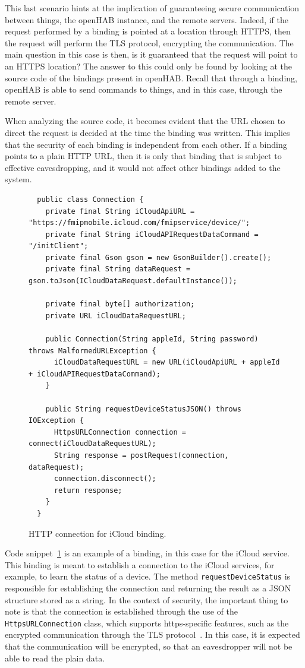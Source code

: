 \documentclass[12pt]{article}
\begin{document}
This last scenario hints at the implication of guaranteeing secure communication between things, the openHAB instance, and the remote servers. Indeed, if the request performed by a binding is pointed at a location through HTTPS, then the request will perform the TLS protocol, encrypting the communication. The main question in this case is then, is it guaranteed that the request will point to an HTTPS location? The answer to this could only be found by looking at the source code of the bindings present in openHAB. Recall that through a binding, openHAB is able to send commands to things, and in this case, through the remote server.

When analyzing the source code, it becomes evident that the URL chosen to direct the request is decided at the time the binding was written. This implies that the security of each binding is independent from each other. If a binding points to a plain HTTP URL, then it is only that binding that is subject to effective eavesdropping, and it would not affect other bindings added to the system.

\begin{figure} [htb]
\begin{lstlisting}
  public class Connection {
    private final String iCloudApiURL = "https://fmipmobile.icloud.com/fmipservice/device/";
    private final String iCloudAPIRequestDataCommand = "/initClient";
    private final Gson gson = new GsonBuilder().create();
    private final String dataRequest = gson.toJson(ICloudDataRequest.defaultInstance());
    
    private final byte[] authorization;
    private URL iCloudDataRequestURL;
    
    public Connection(String appleId, String password) throws MalformedURLException {
      iCloudDataRequestURL = new URL(iCloudApiURL + appleId + iCloudAPIRequestDataCommand);
    } 
    
    public String requestDeviceStatusJSON() throws IOException {
      HttpsURLConnection connection = connect(iCloudDataRequestURL);
      String response = postRequest(connection, dataRequest);
      connection.disconnect();    
      return response;
    }
  }
\end{lstlisting}
\caption{HTTP connection for iCloud binding.}
\label{lst:https_binding}
\end{figure}

Code snippet~\ref{lst:https_binding} is an example of a binding, in this case for the iCloud service. This binding is meant to establish a connection to the iCloud services, for example, to learn the status of a device. The method \texttt{requestDeviceStatus} is responsible for establishing the connection and returning the result as a JSON structure stored as a string. In the context of security, the important thing to note is that the connection is established through the use of the \texttt{HttpsURLConnection} class, which supports https-specific features, such as the encrypted communication through the TLS protocol~\cite{java_01}. In this case, it is expected that the communication will be encrypted, so that an eavesdropper will not be able to read the plain data.
\end{document}
